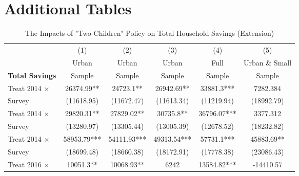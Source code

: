 \documentclass[12pt]{extarticle}
\begin{document}
\clearpage
\appendix
\appendixpage
\makeatletter
\def\@seccntformat#1{\csname named#1\endcsname\csname the#1\endcsname.\quad}
\makeatother
\newcommand{\namedsection}{Appendix }

\setcounter{figure}{0}
\renewcommand{\figurename}{Appendix Figure}
\setcounter{table}{0}
\renewcommand{\tablename}{Appendix Table}

\renewcommand{\thetable}{\thesection.\arabic{table}}
\renewcommand{\thefigure}{\thesection.\arabic{figure}}

\section{Additional Tables}
\begin{table}[h]
\centering
\caption{The Impacts of "Two-Children" Policy on Total Household Savings (Extension)} \label{app:savings_extend}
\begin{threeparttable}
\def\sym#1{\ifmmode^{#1}\else\(^{#1}\)\fi}
\begin{tabular}{l*{5}{c}}
\hline\hline
                    &\multicolumn{1}{c}{(1)}&\multicolumn{1}{c}{(2)}&\multicolumn{1}{c}{(3)}&\multicolumn{1}{c}{(4)}&\multicolumn{1}{c}{(5)}\\
	                &\multicolumn{1}{c}{Urban}&\multicolumn{1}{c}{Urban}&\multicolumn{1}{c}{Urban}&\multicolumn{1}{c}{Full}&\multicolumn{1}{c}{Urban \& Small}\\
\textbf{Total Savings}		&\multicolumn{1}{c}{Sample}&\multicolumn{1}{c}{Sample}&\multicolumn{1}{c}{Sample}&\multicolumn{1}{c}{Sample}&\multicolumn{1}{c}{Sample}\\
\hline
Treat 2014 $\times$ &    26374.99** &     24723.1** &    26942.69** &     33881.3***&    7282.384   \\
\quad 2012 Survey         &  (11618.95)   &  (11672.47)   &  (11613.34)   &  (11219.94)   &  (18992.79)   \\
Treat 2014 $\times$ &    29820.31** &    27829.02** &     30735.8** &    36796.07***&    3377.312   \\
\quad 2014 Survey         &  (13280.97)   &  (13305.44)   &  (13005.39)   &  (12678.52)   &  (18232.82)   \\
Treat 2014 $\times$ &    58953.79***&    54111.93***&    49313.54***&     57731.1***&    45883.69** \\
\quad 2016 Survey         &  (18699.48)   &  (18660.38)   &  (18172.91)   &  (17778.38)   &  (23086.43)   \\
Treat 2016 $\times$ &     10051.3** &    10068.93** &        6242   &    13584.82***&   -14410.57   \\

\end{tabular}
\end{threeparttable}
\end{table}
\end{document}
